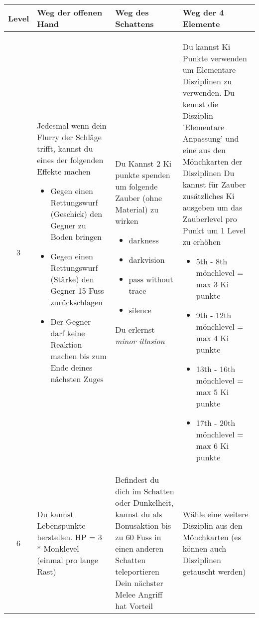 \begin{table}
	\centering
	\begin{tabular}{cp{6cm}p{6cm}p{6cm}}
	\textbf{Level} & \textbf{Weg der offenen Hand} & \textbf{Weg des Schattens} &\textbf{Weg der 4 Elemente}\\ \hline
	3 &
	Jedesmal wenn dein Flurry der Schläge trifft, kannst du eines der folgenden Effekte machen
	\begin{itemize}
		\item Gegen einen Rettungswurf (Geschick) den Gegner zu Boden bringen
		\item Gegen einen Rettungswurf (Stärke) den Gegner 15 Fuss zurückschlagen
		\item Der Gegner darf keine Reaktion machen bis zum Ende deines nächsten Zuges
	\end{itemize} &
	Du Kannst 2 Ki punkte spenden um folgende Zauber (ohne Material) zu wirken
	\begin{itemize}
		\item darkness
		\item darkvision
		\item pass without trace
		\item silence
	\end{itemize}
	Du erlernst \textit{minor illusion}&
	Du kannst Ki Punkte verwenden um Elementare Disziplinen zu verwenden. \linebreak
	Du kennst die Disziplin 'Elementare Anpassung' und eine aus den Mönchkarten der Disziplinen\linebreak
	Du kannst für Zauber zusätzliches Ki ausgeben um das Zauberlevel pro Punkt um 1 Level zu erhöhen
	\begin{itemize}
		\item 5th - 8th mönchlevel = max 3 Ki punkte
		\item 9th - 12th mönchlevel = max 4 Ki punkte
		\item 13th - 16th mönchlevel = max 5 Ki punkte
		\item 17th - 20th mönchlevel = max 6 Ki punkte
	\end{itemize} \\ \hline
	
	6 &
	Du kannst Lebenspunkte herstellen. HP = 3 * Monklevel (einmal pro lange Rast) &
	Befindest du dich im Schatten oder Dunkelheit, kannst du als Bonusaktion bis zu 60 Fuss in einen anderen Schatten teleportieren\linebreak
	Dein nächster Melee Angriff hat Vorteil&
	Wähle eine weitere Disziplin aus den Mönchkarten (es können auch Disziplinen getauscht werden)\\ \hline
	

\end{tabular}
\end{table}
